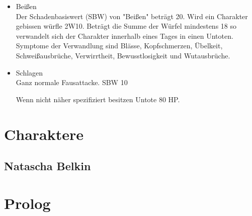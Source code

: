 \begin{itemize}
\begin{itemize}
  \item Beißen
  \\Der Schadenbasiswert (SBW) von "Beißen" beträgt 20. Wird ein Charakter gebissen würfle 2W10. Beträgt die Summe der Würfel mindestens 18 so verwandelt sich der Charakter innerhalb eines Tages in einen Untoten.
  \\Symptome der Verwandlung sind Blässe, Kopfschmerzen, Übelkeit, Schweißausbrüche, Verwirrtheit, Bewusstlosigkeit und Wutausbrüche.
  \item Schlagen
  \\Ganz normale Fausattacke. SBW 10

  Wenn nicht näher spezifiziert besitzen Untote 80 HP.

\end{itemize}
\end{itemize}
\newpage
\section{Charaktere}

\subsection{Natascha Belkin}


\section{Prolog}


